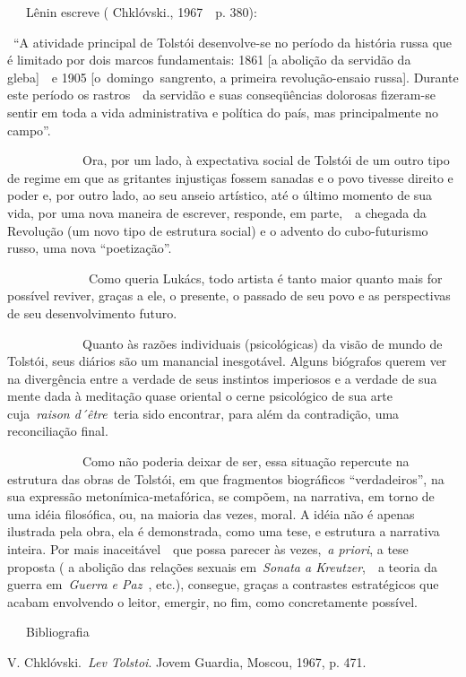 ~~~Lênin escreve ( Chklóvski., 1967~~p. 380):

~``A atividade principal de Tolstói desenvolve-se no período da história
russa que é limitado por dois marcos fundamentais: 1861 {[}a abolição da
servidão da gleba{]}~~e 1905 {[}o~domingo~sangrento, a primeira
revolução-ensaio russa{]}. Durante este período os rastros~~da servidão
e suas conseqüências dolorosas fizeram-se sentir em toda a vida
administrativa e política do país, mas principalmente no campo''.

~~~~~~~~~~~~Ora, por um lado, à expectativa social de Tolstói de um
outro tipo de regime em que as gritantes injustiças fossem sanadas e o
povo tivesse direito e poder e, por outro lado, ao seu anseio artístico,
até o último momento de sua vida, por uma nova maneira de escrever,
responde, em parte,~~a chegada da Revolução (um novo tipo de estrutura
social) e o advento do cubo-futurismo russo, uma nova ``poetização''.

~~~~~~~~~~~~~Como queria Lukács, todo artista é tanto maior quanto mais
for possível reviver, graças a ele, o presente, o passado de seu povo e
as perspectivas de seu desenvolvimento futuro.

~~~~~~~~~~~~Quanto às razões individuais (psicológicas) da visão de
mundo de Tolstói, seus diários são um manancial inesgotável. Alguns
biógrafos querem ver na divergência entre a verdade de seus instintos
imperiosos e a verdade de sua mente dada à meditação quase oriental o
cerne psicológico de sua arte cuja~\emph{{raison d´être}}~teria sido
encontrar, para além da contradição, uma reconciliação final.

~~~~~~~~~~~~Como não poderia deixar de ser, essa situação repercute na
estrutura das obras de Tolstói, em que fragmentos biográficos
``verdadeiros'', na sua expressão metonímica-metafórica, se compõem, na
narrativa, em torno de uma idéia filosófica, ou, na maioria das vezes,
moral. A idéia não é apenas ilustrada pela obra, ela é demonstrada, como
uma tese, e estrutura a narrativa inteira. Por mais inaceitável~~que
possa parecer às vezes,~\emph{a priori}, a tese proposta ( a abolição
das relações sexuais em~\emph{Sonata a Kreutzer},~~a teoria da guerra
em~\emph{Guerra e Paz}~, etc.), consegue, graças a contrastes
estratégicos que acabam envolvendo o leitor, emergir, no fim, como
concretamente possível.

~~~Bibliografia

V. Chklóvski.~\emph{Lev Tolstoi}. Jovem Guardia, Moscou, 1967, p. 471.

